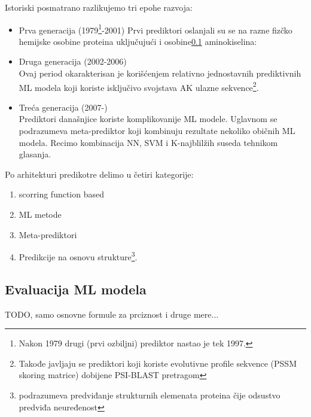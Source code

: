 Istoriski posmatrano razlikujemo tri epohe razvoja:\parencite{meng_c2017}
\begin{itemize}
  \item Prva generacija (1979\footnote{
      Nakon 1979 drugi (prvi ozbiljni) prediktor nastao je tek 1997.\parencite{meng_c2017}
    }-2001)
    Prvi prediktori oslanjali su se na razne fizčko hemijske osobine proteina
    uključujući i osobine\ref{} aminokiselina: 

  \item Druga generacija (2002-2006)\\
    Ovaj period okarakterisan je korišćenjem relativno jednostavnih
    prediktivnih ML modela koji koriste isključivo svojstava AK ulazne
    sekvence\footnote{ Takođe javljaju se prediktori koji koriste evolutivne
      profile sekvence (PSSM skoring matrice) dobijene PSI-BLAST pretragom}.

  \item Treća generacija (2007-)\\
    Prediktori današnjice koriste komplikovanije ML modele. Uglavnom  se
    podrazumeva meta-prediktor koji kombinuju rezultate nekoliko običnih ML
    modela. Recimo kombinacija NN, SVM i K-najblilžih suseda tehnikom
    glasanja.

\end{itemize}


Po arhitekturi predikotre delimo u četiri kategorije:\parencite{meng_c2017}
\begin{enumerate}
  \item
    scorring function based

  \item
    ML metode 

  \item
    Meta-prediktori

  \item
    Predikcije na osnovu strukture\footnote{podrazumeva predviđanje strukturnih
    elemenata proteina čije odsustvo predviđa neuređenost}.
\end{enumerate}


\subsection{Evaluacija ML modela}
TODO, samo osnovne formule za prciznost i druge mere...



